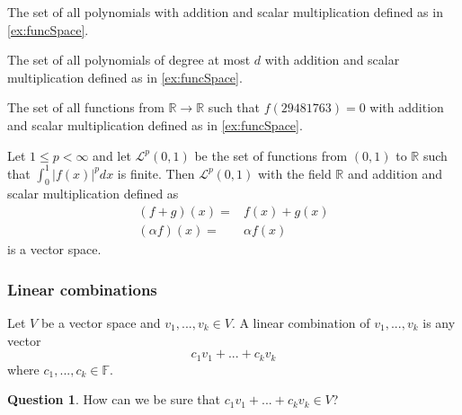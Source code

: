 \documentclass[compress]{beamer}
\def\F{\mathbb{F}}
\def\R{\mathbb{R}}
\theoremstyle{definition}
\newtheorem{question}{Question}
\begin{document}
\begin{frame}
  \begin{example}
    The set of all polynomials with addition and scalar
    multiplication defined as in \ref{ex:funcSpace}.
  \end{example}
  
  \begin{example} 
    The set of all polynomials of degree at most $d$ with addition and scalar
    multiplication defined as in \ref{ex:funcSpace}.
  \end{example}  

  \begin{example}
    The set of all functions from $\R \to \R$ such that $f(29481763) =
    0$ with addition and scalar multiplication defined as in
    \ref{ex:funcSpace}.
  \end{example}
\end{frame}

\begin{frame}
  \begin{example}\label{ex:LP}
    Let $1 \leq p < \infty$ and let $\mathcal{L}^p(0,1)$ be the set of
    functions from $(0,1)$ to $\R$ such that $\int_0^1 |f(x)|^p dx$ is
    finite.  Then $\mathcal{L}^p (0,1)$ with the field $\R$ and
    addition and scalar multiplication defined as
    \begin{align*}
      (f + g)(x) = & f(x) + g(x) \\
      (\alpha f)(x) = & \alpha f(x)
    \end{align*} 
    is a vector space. 
  \end{example}
\end{frame}

\subsubsection{Linear combinations}

\begin{frame}
  \begin{definition}
    Let $V$ be a vector space and $v_1,..., v_k \in V$. A linear
    combination of $v_1,..., v_k$ is any vector 
    \[c_1 v_1 + ... + c_k v_k \]
    where $c_1, ..., c_k \in \F$. 
  \end{definition}
  \begin{question} 
    How can we be sure that $c_1 v_1 + ... + c_k v_k \in V$?
  \end{question}
\end{frame}
\end{document}
